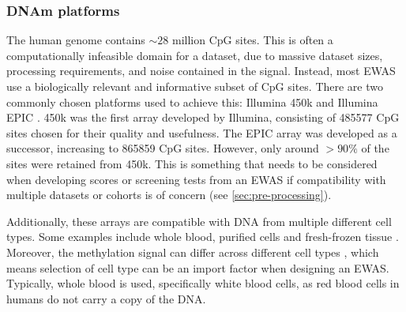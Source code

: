 \documentclass{article}
\begin{document}
\subsubsection{DNAm platforms}
The human genome contains \(\sim\!28\) million CpG sites. This is often a computationally infeasible domain for a dataset, due to massive dataset sizes, processing requirements, and noise contained in the signal. Instead, most EWAS use a biologically relevant and informative subset of CpG sites. There are two commonly chosen platforms used to achieve this: Illumina 450k \cite{illumina2012methylation450} and Illumina EPIC \cite{illumina2015methylationepic}. 450k was the first array developed by Illumina, consisting of \num{485577} CpG sites chosen for their quality and usefulness. The EPIC array was developed as a successor, increasing to \num{865859} CpG sites. However, only around \(>90\%\) of the sites were retained from 450k. This is something that needs to be considered when developing scores or screening tests from an EWAS if compatibility with multiple datasets or cohorts is of concern (see \ref{sec:pre-processing}).

Additionally, these arrays are compatible with DNA from multiple different cell types. Some examples include whole blood, purified cells and fresh-frozen tissue \cite{bhat2022data}. Moreover, the methylation signal can differ across different cell types \cite{huang2016epigenome}, which means selection of cell type can be an import factor when designing an EWAS. Typically, whole blood is used, specifically white blood cells, as red blood cells in humans do not carry a copy of the DNA.

\end{document}

